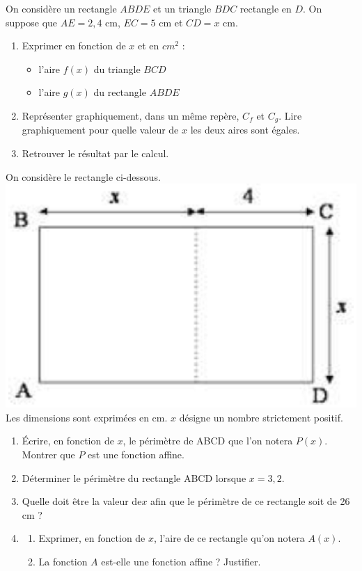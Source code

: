 \begin{exercice}
On considère un rectangle $ABDE$ et un triangle $BDC$ rectangle en $D$. On suppose que $AE=2,4$ cm, $EC=5$ cm et $CD=x$ cm.\\
\begin{enumerate}
\item Exprimer en fonction de $x$ et en $cm^2$ :
\begin{itemize}
\item l'aire $f(x)$ du triangle $BCD$
\item l'aire $g(x)$ du rectangle $ABDE$
\end{itemize}
\item Représenter graphiquement, dans un même repère, $C_f$ et $C_g$. Lire graphiquement pour quelle valeur de $x$ les deux aires sont égales.
\item Retrouver le résultat par le calcul.
\end{enumerate}
\end{exercice}

\begin{exercice}
On considère le rectangle ci-dessous.
\includegraphics[scale=0.55]{FonctionsAffines/figures/FA1.eps}
Les dimensions sont exprimées en cm.
$x$ désigne un nombre strictement positif.
\begin{enumerate}
\item Écrire, en fonction  de $x$, le périmètre de ABCD que l’on notera $P(x)$. 
Montrer que $P$ est une fonction affine.
\item Déterminer le périmètre du rectangle ABCD lorsque $x=3,2$.
\item  Quelle doit être la valeur de$x$   afin que le périmètre de ce rectangle soit de 26 cm ?
\item
\begin{enumerate}
\item Exprimer, en fonction de $x$, l’aire de ce rectangle qu’on notera $A(x)$.
\item La fonction $A$  est-elle une fonction affine ? Justifier.
\end{enumerate}
\end{enumerate}
\end{exercice}

